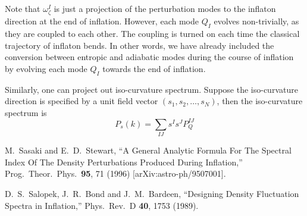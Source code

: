 \documentclass[11pt]{article}
\begin{document}
Note that $\omega_\zeta^I$ is just a projection of the perturbation modes to the inflaton direction at the end of inflation. However, each mode $Q_I$ evolves non-trivially, as they are coupled to each other. The coupling is turned on each time the classical trajectory of inflaton bends. In other words, we have already included the conversion between entropic and adiabatic modes during the course of inflation by evolving each mode $Q_I$ towards the end of inflation. 

Similarly, one can project out iso-curvature spectrum. Suppose the iso-curvature direction is specified by a unit field vector $(s_1, s_2, \dots, s_N)$, then the iso-curvature spectrum is 
\begin{equation}
P_s (k) = \sum_{IJ} s^I s^J P_Q^{IJ}
\end{equation}


\begin{thebibliography}{}

  M.~Sasaki and E.~D.~Stewart,
  ``A General Analytic Formula For The Spectral Index Of The Density
  Perturbations Produced During Inflation,''
  Prog.\ Theor.\ Phys.\  {\bf 95}, 71 (1996)
  [arXiv:astro-ph/9507001].

  D.~S.~Salopek, J.~R.~Bond and J.~M.~Bardeen,
  ``Designing Density Fluctuation Spectra in Inflation,''
  Phys.\ Rev.\ D {\bf 40}, 1753 (1989).

\end{thebibliography}
\end{document}
